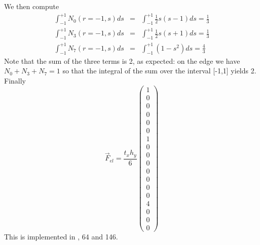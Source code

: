 We then compute
\begin{eqnarray}
\int_{-1}^{+1} N_0(r=-1,s) ds 
&=& \int_{-1}^{+1} \frac{1}{2}s(s-1) ds = \frac{1}{3} \\
\int_{-1}^{+1} N_3(r=-1,s) ds 
&=& \int_{-1}^{+1} \frac{1}{2}s(s+1) ds = \frac{1}{3} \\
\int_{-1}^{+1} N_7(r=-1,s) ds 
&=& \int_{-1}^{+1} (1-s^2) ds = \frac{4}{3} 
\end{eqnarray}
Note that the sum of the three terms is 2, as expected: on the edge
we have $N_0+N_3+N_7 =1$ so that the integral of the sum over the 
interval [-1,1] yields 2. Finally 
\[
\vec{F}_{el}
=
\frac{t_x  h_y}{6}
\left(
\begin{array}{c}
1 \\
0 \\
0 \\
0 \\
0 \\
0 \\
1 \\
0 \\
0 \\
0 \\
0 \\
0 \\
0 \\
0 \\
4 \\
0 \\
0 \\
0
\end{array}
\right)
\]
This is implemented in , 64 and 146.

